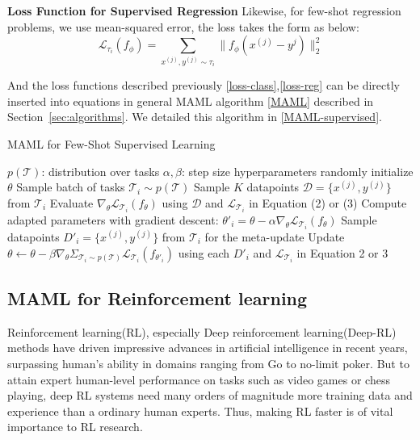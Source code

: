\textbf{Loss Function for Supervised Regression}
Likewise, for few-shot regression problems, we use mean-squared error, the loss takes the form as below:
\begin{equation}
    \label{loss-reg}
    \mathcal{L}_{\tau_i}(f_\phi) = \sum_{x^{(j)},y^{(j)}\sim\tau_i} \parallel f_\phi(x^{(j)} - y^{j})\parallel_2^2 
    \tag{4}
\end{equation}

And the loss functions described previously \ref{loss-class},\ref{loss-reg} can be directly inserted into equations in general MAML algorithm \ref{MAML} described in Section~\ref{sec:algorithms}.
We detailed this algorithm in \ref{MAML-supervised}.

\begin{algorithm}
  \caption{MAML for Few-Shot Supervised Learning}
  \label{MAML-supervised}
  \begin{algorithmic}[1]
    \REQUIRE $p(\mathcal{T})$: distribution over tasks
    \REQUIRE $\alpha, \beta$: step size hyperparameters
    \STATE randomly initialize $\theta$
    \STATE Sample batch of tasks $\mathcal{T}_i \sim p(\mathcal{T})$
    \STATE Sample $K$ datapoints $\mathcal{D}=\{x^{(j)}, y^{(j)}\}$ from $\mathcal{T}_i$
    \STATE Evaluate $\nabla_\theta \mathcal{L}_{\mathcal{T}_i} (f_\theta)$ using $\mathcal{D}$ and $\mathcal{L}_{\mathcal{T}_i}$ in Equation (2) or (3)
    \STATE Compute adapted parameters with gradient descent: $\theta'_i = \theta - \alpha\nabla_\theta \mathcal{L}_{\mathcal{T}_i} (f_\theta)$
    \STATE Sample datapoints $D'_i=\{x^{(j)}, y^{(j)}\}$ from $\mathcal{T}_i$ for the meta-update
    \ENDFOR
    \STATE Update $\theta \leftarrow \theta - \beta\nabla_\theta \Sigma_{\mathcal{T}_i \sim p(\mathcal{T})}\mathcal{L}_{\mathcal{T}_i} (f_{\theta'_i})$ using each $D'_i$ and $\mathcal{L}_{\mathcal{T}_i} $ in Equation 2 or 3
    \ENDWHILE
  \end{algorithmic}
\end{algorithm}


\subsection{MAML for Reinforcement learning}
Reinforcement learning(RL), especially Deep reinforcement learning(Deep-RL) methods have driven impressive advances in artificial intelligence in recent years, surpassing human's ability in domains ranging from Go to no-limit poker. But to attain expert human-level performance on tasks such as video games or chess playing, deep RL systems need many orders of magnitude more training data and experience than a ordinary human experts. Thus, making RL faster is of vital importance to RL research.


